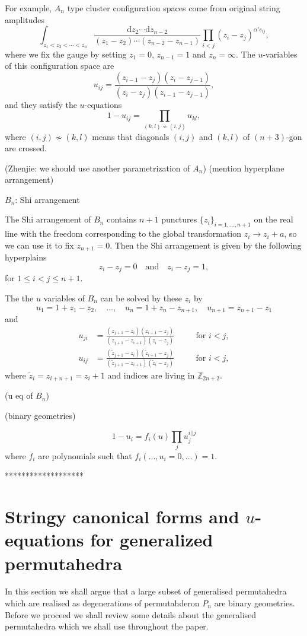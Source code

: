 \documentclass[hidelinks,12pt]{article}
\begin{document}
For example, $A_n$ type cluster configuration spaces come from original string 
amplitudes
\[
	\int_{z_1<z_2<\cdots <z_n}
	\frac{\mathrm dz_2\cdots \mathrm dz_{n-2}}{(z_1-z_2)\cdots (z_{n-2}-z_{n-1})}
	\prod_{i<j} (z_i-z_j)^{\alpha' s_{ij}},
\]
where we fix the gauge by setting $z_1=0$, $z_{n-1}=1$ and $z_n=\infty$.
The $u$-variables of this configuration space are
\[
	u_{ij}=\frac{(z_{i-1}-z_j)(z_i-z_{j-1})}{(z_i-z_j)(z_{i-1}-z_{j-1})},
\]
and they satisfy the $u$-equations
\[
	1-u_{ij}=\prod_{(k,l)\not\sim (i,j)}u_{kl},
\]
where $(i,j)\not\sim (k,l)$ means that diagonals $(i,j)$ and $(k,l)$ of
$(n+3)$-gon are crossed.

(Zhenjie: we should use another parametrization of $A_n$) 
(mention hyperplane arrangement)

$B_n$: Shi arrangement

The Shi arrangement of $B_n$ contains $n+1$ punctures $\{z_i\}_{i=1,\dots,n+1}$ 
on the real line with the freedom corresponding to the global transformation 
$z_i\to z_i+a$, so we can use it to fix $z_{n+1}=0$. Then the Shi arrangement is 
given by the following hyperplains
\[
    z_i-z_j=0\quad \text{and}\quad z_i-z_j=1,
\]
for $1\leq i<j\leq n+1$. 

The the $u$ variables of $B_n$ can be solved by these $z_i$ by 
\[
    u_1=1+z_1-z_2,\quad \dots,\quad u_{n}=1+z_{n}-z_{n+1},\quad u_{n+1}=z_{n+1}-z_1
\]
and 
\[
\begin{aligned}
    u_{ji}&=\frac{(z_{j+1}-z_{i})(z_{i+1}-z_j)}{(z_{j+1}-z_{i+1})(z_i-z_j)}\quad &&\text{for $i<j$},\\
    u_{ij}&=\frac{(\tilde z_{j+1}-z_{i})(\tilde z_{i+1}-z_j)}{(\tilde z_{j+1}-z_{i+1})(\tilde z_i-z_j)}\quad &&\text{for $i<j$},
\end{aligned}
\]
where $\tilde{z}_i=z_{i+n+1}=z_{i}+1$ and indices are living in $\mathbb Z_{2n+2}$.

(u eq of $B_n$)

(binary geometries)



\[
	1-u_i=f_i(u)\prod_{j}u_j^{i||j}
\]
where $f_i$ are polynomials such that $f_i(\dots,u_i=0,\dots)=1$.


*******************

\newpage
\section{Stringy canonical forms and $u$-equations for generalized permutahedra}
In this section we shall argue that  a large subset of generalised permutahedra which are realised as degenerations of permutahderon $P_n$ are binary geometries. Before we proceed we shall review some details about the generalised permutahedra which we shall use throughout the paper.
\end{document}
